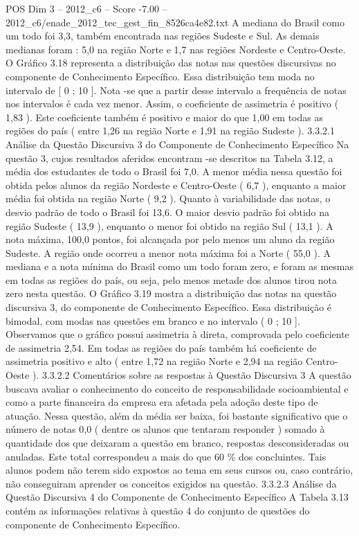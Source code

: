 \begin{textsample}{POS Dim 3 – 2012\_c6 – Score -7.00 – 2012\_c6/enade\_2012\_tec\_gest\_fin\_8526ca4e82.txt}
A mediana do Brasil como um todo foi 3,3, também encontrada nas regiões Sudeste e Sul.
As demais medianas foram : 5,0 na região Norte e 1,7 nas regiões Nordeste e Centro-Oeste.
O Gráfico 3.18 representa a distribuição das notas nas questões discursivas no componente de Conhecimento Específico.
Essa distribuição tem moda no intervalo de [ 0 ; 10 ].
Nota -se que a partir desse intervalo a frequência de notas nos intervalos é cada vez menor.
Assim, o coeficiente de assimetria é positivo ( 1,83 ).
Este coeficiente também é positivo e maior do que 1,00 em todas as regiões do país ( entre 1,26 na região Norte e 1,91 na região Sudeste ). 3.3.2.1 Análise da Questão Discursiva 3 do Componente de Conhecimento Específico Na questão 3, cujos resultados aferidos encontram -se descritos na Tabela 3.12, a média dos estudantes de todo o Brasil foi 7,0.
A menor média nessa questão foi obtida pelos alunos da região Nordeste e Centro-Oeste ( 6,7 ), enquanto a maior média foi obtida na região Norte ( 9,2 ).
Quanto à variabilidade das notas, o desvio padrão de todo o Brasil foi 13,6.
O maior desvio padrão foi obtido na região Sudeste ( 13,9 ), enquanto o menor foi obtido na região Sul ( 13,1 ).
A nota máxima, 100,0 pontos, foi alcançada por pelo menos um aluno da região Sudeste.
A região onde ocorreu a menor nota máxima foi a Norte ( 55,0 ).
A mediana e a nota mínima do Brasil como um todo foram zero, e foram as mesmas em todas as regiões do país, ou seja, pelo menos metade dos alunos tirou nota zero nesta questão.
O Gráfico 3.19 mostra a distribuição das notas na questão discursiva 3, do componente de Conhecimento Específico.
Essa distribuição é bimodal, com modas nas questões em branco e no intervalo ( 0 ; 10 ].
Observamos que o gráfico possui assimetria à direta, comprovada pelo coeficiente de assimetria 2,54.
Em todas as regiões do país também há coeficiente de assimetria positivo e alto ( entre 1,72 na região Norte e 2,94 na região Centro-Oeste ). 3.3.2.2 Comentários sobre as respostas à Questão Discursiva 3 A questão buscava avaliar o conhecimento do conceito de responsabilidade socioambiental e como a parte financeira da empresa era afetada pela adoção deste tipo de atuação.
Nessa questão, além da média ser baixa, foi bastante significativo que o número de notas 0,0 ( dentre os alunos que tentaram responder ) somado à quantidade dos que deixaram a questão em branco, respostas desconsideradas ou anuladas.
Este total correspondeu a mais do que 60 \% dos concluintes.
Tais alunos podem não terem sido expostos ao tema em seus cursos ou, caso contrário, não conseguiram aprender os conceitos exigidos na questão. 3.3.2.3 Análise da Questão Discursiva 4 do Componente de Conhecimento Específico A Tabela 3.13 contém as informações relativas à questão 4 do conjunto de questões do componente de Conhecimento Específico.

\end{textsample}
